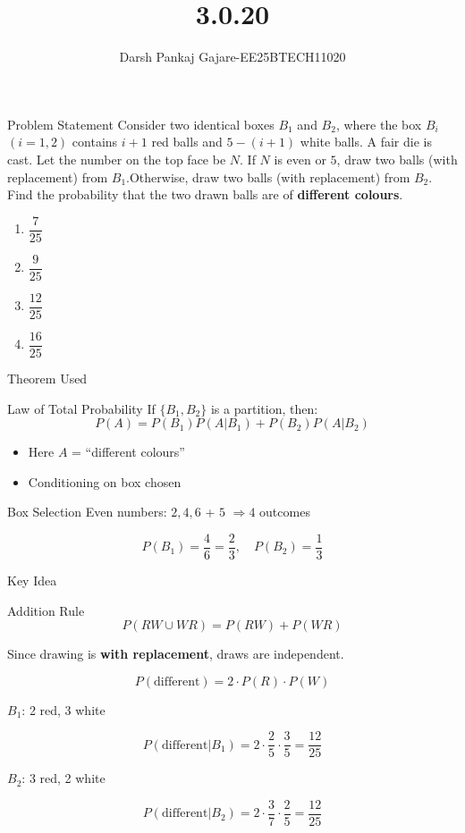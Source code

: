 \documentclass{beamer}
\title{3.0.20}
\author{Darsh Pankaj Gajare-EE25BTECH11020}
\date{}
\begin{document}
\frame{\titlepage}

\begin{frame}{Problem Statement}
Consider two identical boxes $B_1$ and $B_2$, where the box $B_i$ $(i = 1,2)$ contains $i+1$ red balls and $5 - (i + 1)$ white balls. A fair die is cast. Let the number on the top face be $N$. If $N$ is even or $5$, draw two balls (with replacement) from $B_1$.Otherwise, draw two balls (with replacement) from $B_2$. Find the probability that the two drawn balls are of \textbf{different colours}.
\begin{enumerate}
    \item[(a)] $\dfrac{7}{25}$
    \item[(b)] $\dfrac{9}{25}$
    \item[(c)] $\dfrac{12}{25}$
    \item[(d)] $\dfrac{16}{25}$
\end{enumerate}
\end{frame}

\begin{frame}{Theorem Used}
\begin{block}{Law of Total Probability}
If $\{B_1, B_2\}$ is a partition, then:
\[
P(A) = P(B_1)P(A|B_1) + P(B_2)P(A|B_2)
\]
\end{block}

\begin{itemize}
    \item Here $A$ = ``different colours''
    \item Conditioning on box chosen
\end{itemize}
\end{frame}

\begin{frame}{Box Selection}
Even numbers: $2,4,6$ + $5$ $\Rightarrow 4$ outcomes

\[
P(B_1) = \frac{4}{6} = \frac{2}{3}, \quad P(B_2) = \frac{1}{3}
\]
\end{frame}


\begin{frame}{Key Idea}
\begin{block}{Addition Rule}
\[
P(RW \cup WR) = P(RW) + P(WR)
\]
\end{block}
Since drawing is \textbf{with replacement}, draws are independent.

\[
P(\text{different}) = 2 \cdot P(R)\cdot P(W)
\]

$B_1$: 2 red, 3 white

\[
P(\text{different}|B_1) = 2 \cdot \frac{2}{5}\cdot \frac{3}{5} = \frac{12}{25}
\]

$B_2$: 3 red, 2 white

\[
P(\text{different}|B_2) = 2 \cdot \frac{3}{7}\cdot \frac{2}{5} = \frac{12}{25}
\]
\end{frame}
\end{document}
